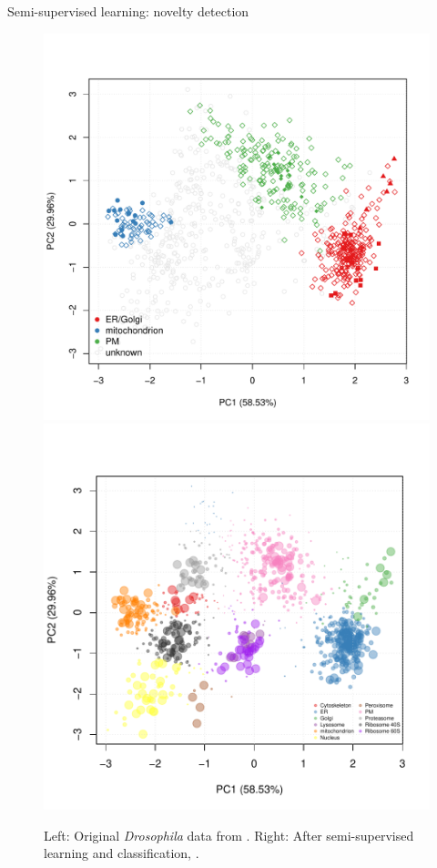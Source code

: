 \begin{frame}{Semi-supervised learning: novelty detection}
  \begin{figure}
    \includegraphics[width=.48\linewidth]{figs_all/tan2009r1org.pdf}
    \includegraphics[width=.5\linewidth]{figs_all/pdres2fig.pdf}
    \caption{Left: Original \textit{Drosophila} data from
      \cite{Tan2009}. Right: After semi-supervised learning and
      classification, \cite{Breckels:2013}.}
  \end{figure}
\end{frame}


